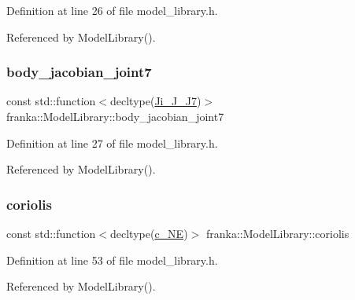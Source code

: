 Definition at line 26 of file model\+\_\+library.\+h.



Referenced by Model\+Library().

\mbox{\label{classfranka_1_1ModelLibrary_aa304c3c44b1e2a8b53782fd93277826c}} 
\subsubsection{\texorpdfstring{body\+\_\+jacobian\+\_\+joint7}{body\_jacobian\_joint7}}
{\footnotesize\ttfamily const std\+::function$<$decltype(\hyperlink{libfcimodels_8h_ac701d80eb32250724b34b0303d5d28ad}{Ji\+\_\+\+J\+\_\+\+J7})$>$ franka\+::\+Model\+Library\+::body\+\_\+jacobian\+\_\+joint7}



Definition at line 27 of file model\+\_\+library.\+h.



Referenced by Model\+Library().

\mbox{\label{classfranka_1_1ModelLibrary_aad26e1d65eddd882c2b987397553b389}} 
\subsubsection{\texorpdfstring{coriolis}{coriolis}}
{\footnotesize\ttfamily const std\+::function$<$decltype(\hyperlink{libfcimodels_8h_a5a32397c0bb46fe289468cd700b4e905}{c\+\_\+\+NE})$>$ franka\+::\+Model\+Library\+::coriolis}



Definition at line 53 of file model\+\_\+library.\+h.



Referenced by Model\+Library().

\mbox{\label{classfranka_1_1ModelLibrary_aa2acabf8d02fceb0eda60898bc4937b6}} 
